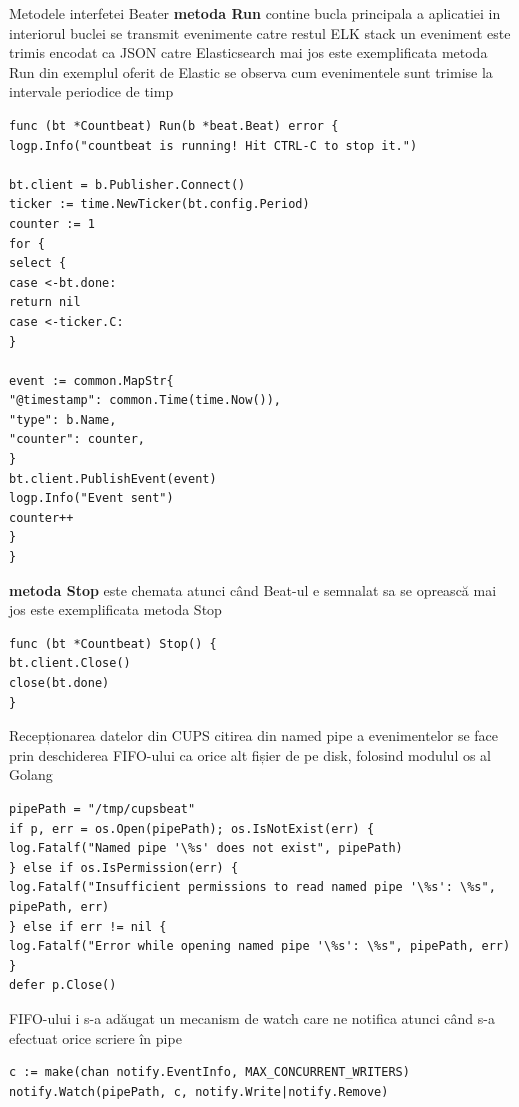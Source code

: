 \documentclass[12pt]{report}
\begin{document}
\begin{outline}
\1 {\large Metodele interfetei Beater}
	\2
	\textbf{metoda Run}
		\3 contine bucla principala a aplicatiei
		\3 in interiorul buclei se transmit evenimente catre restul ELK stack
		\3 un eveniment este trimis encodat ca JSON catre Elasticsearch
		\3 mai jos este exemplificata metoda Run din exemplul oferit de Elastic
		\3 se observa cum evenimentele sunt trimise la intervale periodice de timp
\begin{lstlisting}[caption={exemplu metoda Run - golang},captionpos=b]
func (bt *Countbeat) Run(b *beat.Beat) error {
logp.Info("countbeat is running! Hit CTRL-C to stop it.")

bt.client = b.Publisher.Connect()
ticker := time.NewTicker(bt.config.Period)
counter := 1
for {
select {
case <-bt.done:
return nil
case <-ticker.C:
}

event := common.MapStr{
"@timestamp": common.Time(time.Now()),
"type": b.Name,
"counter": counter,
}
bt.client.PublishEvent(event)
logp.Info("Event sent")
counter++
}
}
\end{lstlisting}

	\2
	\textbf{metoda Stop}
		\3 este chemata atunci când Beat-ul e semnalat sa se oprească
		\3 mai jos este exemplificata metoda Stop
\begin{lstlisting}[caption={exemplu metoda Stop - golang},captionpos=b]
func (bt *Countbeat) Stop() {
bt.client.Close()
close(bt.done)
}
\end{lstlisting}
\1 {\large Recepționarea datelor din CUPS}
	\2 citirea din named pipe a evenimentelor se face prin deschiderea FIFO-ului ca orice alt fișier de pe disk, folosind modulul os al Golang
\begin{lstlisting}[caption={deschidere named pipe - golang},captionpos=b]
pipePath = "/tmp/cupsbeat"
if p, err = os.Open(pipePath); os.IsNotExist(err) {
log.Fatalf("Named pipe '\%s' does not exist", pipePath)
} else if os.IsPermission(err) {
log.Fatalf("Insufficient permissions to read named pipe '\%s': \%s", pipePath, err)
} else if err != nil {
log.Fatalf("Error while opening named pipe '\%s': \%s", pipePath, err)
}
defer p.Close()
\end{lstlisting}

	\2 FIFO-ului i s-a adăugat un mecanism de watch care ne notifica atunci când s-a efectuat orice scriere în pipe
\begin{lstlisting}[caption={watch pentru named pipe - golang},captionpos=b]
c := make(chan notify.EventInfo, MAX_CONCURRENT_WRITERS)
notify.Watch(pipePath, c, notify.Write|notify.Remove)
\end{lstlisting}


\end{outline}
\end{document}

